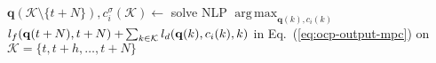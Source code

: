 \documentclass[letterpaper,10pt,journal,twoside]{IEEEtran}
\theoremstyle{definition}
\DeclareMathOperator*{\argmax}{arg\,max}
\begin{document}
\begin{algorithm}[t]
  \begin{algorithmic}[1]
    \small
      \makeatletter
      \setcounter{ALC@line}{15}
      \makeatother
      \color{blue}\STATE $\mathbf{q}(\mathcal{K}\setminus\{t+N\}),c_i^\sigma(\mathcal{K})\gets${ \vspace*{.3ex}solve NLP }$\argmax_{\mathbf{q}(k),c_i(k)}$ \vspace*{.7ex}\hspace*{1em}${l_f(\mathbf{q}(t+\hspace*{-.1ex}N),t+\hspace*{-.1ex}N)}+\hspace*{-.2ex}{\sum_{k\in\mathcal{K}}{l_d(\mathbf{q}(k),c_i(k),k)}}${ in Eq.~(\ref{eq:ocp-output-mpc}) \hspace*{1em}on }$\mathcal{K}=\{t,t+h,\dots,t+N\}$\vspace*{.3ex}\label{alg:mpc}
      

\end{algorithmic}
\end{algorithm}
\end{document}

